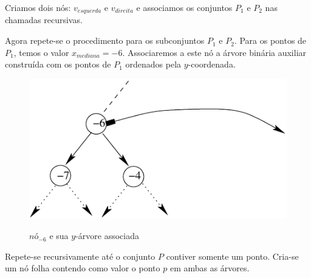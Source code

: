 Criamos dois nós: $v_{esquerda}$ e $v_{direita}$ e associamos os conjuntos $P_1$ e $P_2$ nas chamadas
recursivas.

Agora repete-se o procedimento para os subconjuntos $P_1$ e $P_2$.
Para os pontos de $P_1$, temos o valor $x_{mediana} = -6$. Associaremos a este nó a árvore binária auxiliar
construída com os pontos de $P_1$ ordenados pela $y$-coordenada.
\begin{figure}[h!]
\centering
\begin{minipage}{.5\textwidth}
  \centering
  \includegraphics[width=.8\linewidth]{images/range_tree3.pdf}

  \label{fig:test1}
\end{minipage}%
\begin{minipage}{.5\textwidth}
  \centering
  
  \label{fig:test2}
 
\end{minipage}
 \caption{$nó_{-6}$ e sua $y$-árvore associada}
\end{figure}


Repete-se recursivamente  até o conjunto $P$ contiver somente um ponto.
Cria-se um nó folha contendo como valor o ponto $p$ em ambas as árvores.

